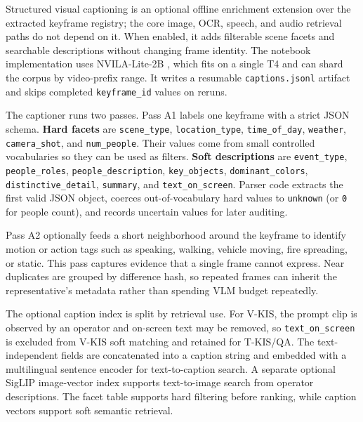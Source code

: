 \documentclass[conference]{IEEEtran}
\newcommand{\field}[1]{\nolinkurl{#1}}
\begin{document}
Structured visual captioning is an optional offline enrichment extension over
the extracted keyframe registry; the core image, OCR, speech, and audio
retrieval paths do not depend on it. When enabled, it adds filterable scene
facets and searchable descriptions without changing frame identity. The
notebook implementation uses NVILA-Lite-2B \cite{liu2024nvila}, which fits on a
single T4 and can shard the corpus by video-prefix range. It writes a resumable
\texttt{captions.jsonl} artifact and skips completed \field{keyframe_id} values
on reruns.

The captioner runs two passes. Pass A1 labels one keyframe with a strict JSON
schema. \textbf{Hard facets} are \field{scene_type}, \field{location_type},
\field{time_of_day}, \field{weather}, \field{camera_shot}, and
\field{num_people}. Their values come from small controlled vocabularies so they
can be used as filters. \textbf{Soft descriptions} are \field{event_type},
\field{people_roles}, \field{people_description}, \field{key_objects},
\field{dominant_colors}, \field{distinctive_detail}, \field{summary}, and
\field{text_on_screen}. Parser code extracts the first valid JSON object,
coerces out-of-vocabulary hard values to \texttt{unknown} (or \texttt{0} for
people count), and records uncertain values for later auditing.

Pass A2 optionally feeds a short neighborhood around the keyframe to identify
motion or action tags such as speaking, walking, vehicle moving, fire spreading,
or static. This pass captures evidence that a single frame cannot express. Near
duplicates are grouped by difference hash, so repeated frames can inherit the
representative's metadata rather than spending VLM budget repeatedly.

The optional caption index is split by retrieval use. For V-KIS, the prompt
clip is observed by an operator and on-screen text may be removed, so
\field{text_on_screen} is excluded from V-KIS soft matching and retained for
T-KIS/QA. The text-independent fields are concatenated into a caption string and
embedded with a multilingual sentence encoder for text-to-caption search. A
separate optional SigLIP image-vector index supports text-to-image search from
operator descriptions. The facet table supports hard filtering before ranking,
while caption vectors support soft semantic retrieval.
\end{document}
